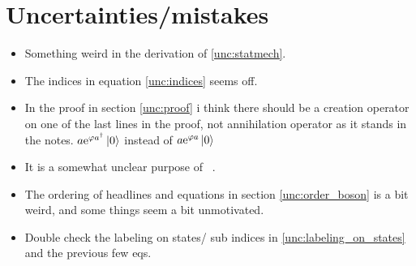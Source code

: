 \section{Uncertainties/mistakes}

\begin{itemize}
\item Something weird in the derivation of \eqref{unc:statmech}.
\item The indices in equation \eqref{unc:indices} seems off.  
\item In the proof in section \ref{unc:proof} i think there should be a creation operator on one of the last lines in the proof, not annihilation operator as it stands in the notes. $a\mathrm{e}^{\varphi a^\dagger}\ket{0}$ instead of $a\mathrm{e}^{\varphi a}\ket{0}$
\item It is a somewhat unclear purpose of ~. 
\item The ordering of headlines and equations in section \ref{unc:order_boson} is a bit weird, and some things seem a bit unmotivated. 
\item Double check the labeling on states/ sub indices in \eqref{unc:labeling_on_states} and the previous few eqs. 

\end{itemize}